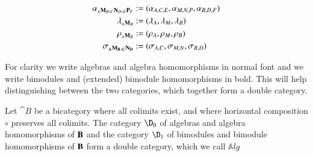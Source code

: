 \documentclass{amsart}
\newcommand{\Alg}{\mathbb{A}\mathit{lg}}
\newcommand{\hor}{\circ}
\begin{document}
\begin{align}
 {\bf \alpha}_{_A{\bf M}_B,_C{\bf N}_D,_E{\bf P}_F} &:= (\alpha_{A,C,E}, \alpha_{M,N,P}, \alpha_{B,D,F}) 
\\{\bf \lambda}_{_A{\bf M}_B}&:= (\lambda_A, \lambda_M, \lambda_B)
\\{\bf \rho}_{_A{\bf M}_B} &:= (\rho_A, \rho_M, \rho_B)
\\{\bf \sigma}_{\bf {}_AM_B,{}_CN_D}&: = (\sigma_{A,C}, \sigma_{M,N}, \sigma_{B,D})
\end{align}

For clarity we write algebras and algebra homomorphisms in normal font and we write bimodules and (extended) bimodule homomorphisms in bold. This will help distinguishing between the two categories, which together form a double category.

\begin{lem}\label{lem:algdouble}
Let ${\cat B}$ be a bicategory where all colimits exist, and where horizontal composition $\hor$ preserves all colimits. The category $\D_0$ of algebras and algebra homomorphisms of ${\bf B}$ and the category $\D_1$ of bimodules and bimodule homomorphisms of ${\bf B}$ form a double category, which we call $\Alg$
\end{lem}
\end{document}
